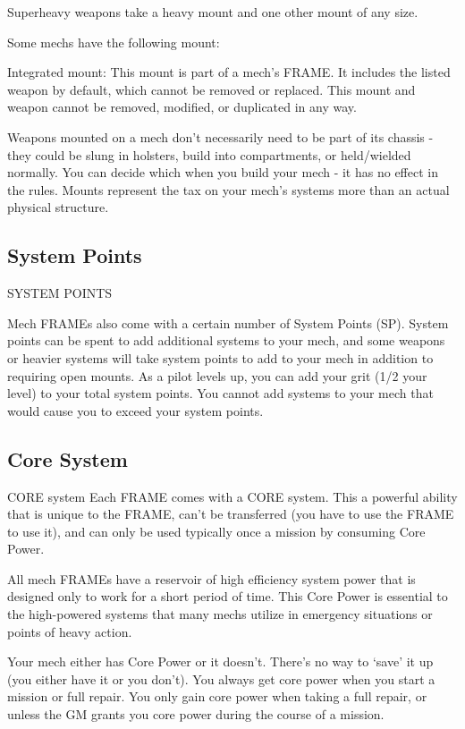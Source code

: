 Superheavy weapons take a heavy mount and one other mount of any size.


Some mechs have the following mount:


Integrated mount: This mount is part of a mech’s FRAME. It includes the listed weapon by
default, which cannot be removed or replaced. This mount and weapon cannot be removed,
modified, or duplicated in any way.


Weapons mounted on a mech don’t necessarily need to be part of its chassis - they could be
slung in holsters, build into compartments, or held/wielded normally. You can decide which when
you build your mech - it has no effect in the rules. Mounts represent the tax on your mech’s
systems more than an actual physical structure.


\subsection{System Points}
                                          SYSTEM POINTS


Mech FRAMEs also come with a certain number of System Points (SP). System points can be
spent to add additional systems to your mech, and some weapons or heavier systems will take
system points to add to your mech in addition to requiring open mounts. As a pilot levels up, you
can add your grit (1/2 your level) to your total system points. You cannot add systems to your
mech that would cause you to exceed your system points.

\subsection{Core System}
                                             CORE system
Each FRAME comes with a CORE system. This a powerful ability that is unique to the FRAME,
can’t be transferred (you have to use the FRAME to use it), and can only be used typically once a
mission by consuming Core Power.


All mech FRAMEs have a reservoir of high efficiency system power that is designed only to work
for a short period of time. This Core Power is essential to the high-powered systems that many
mechs utilize in emergency situations or points of heavy action.


Your mech either has Core Power or it doesn’t. There’s no way to ‘save’ it up (you either have it
or you don’t). You always get core power when you start a mission or full repair. You only gain
core power when taking a full repair, or unless the GM grants you core power during the course
of a mission.

